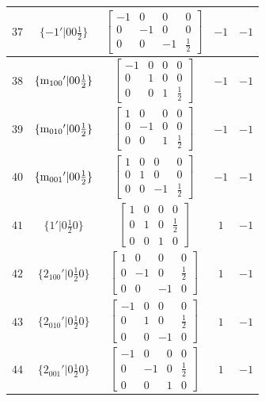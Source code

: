 \documentclass[fleqn,8pt]{jsarticle}
\begin{document}
\begin{longtable}{ccccc}
$ 37 $ & $ \{-1{}'|0 0 \frac{1}{2}\} $ & $ \begin{bmatrix} -1 & 0 & 0 & 0 \\ 0 & -1 & 0 & 0 \\ 0 & 0 & -1 & \frac{1}{2} \end{bmatrix} $ & $ -1 $ & $ -1 $ \\ \hline
$ 38 $ & $ \{{\rm m}_{100}{}'|0 0 \frac{1}{2}\} $ & $ \begin{bmatrix} -1 & 0 & 0 & 0 \\ 0 & 1 & 0 & 0 \\ 0 & 0 & 1 & \frac{1}{2} \end{bmatrix} $ & $ -1 $ & $ -1 $ \\ \hline
$ 39 $ & $ \{{\rm m}_{010}{}'|0 0 \frac{1}{2}\} $ & $ \begin{bmatrix} 1 & 0 & 0 & 0 \\ 0 & -1 & 0 & 0 \\ 0 & 0 & 1 & \frac{1}{2} \end{bmatrix} $ & $ -1 $ & $ -1 $ \\ \hline
$ 40 $ & $ \{{\rm m}_{001}{}'|0 0 \frac{1}{2}\} $ & $ \begin{bmatrix} 1 & 0 & 0 & 0 \\ 0 & 1 & 0 & 0 \\ 0 & 0 & -1 & \frac{1}{2} \end{bmatrix} $ & $ -1 $ & $ -1 $ \\ \hline
$ 41 $ & $ \{1{}'|0 \frac{1}{2} 0\} $ & $ \begin{bmatrix} 1 & 0 & 0 & 0 \\ 0 & 1 & 0 & \frac{1}{2} \\ 0 & 0 & 1 & 0 \end{bmatrix} $ & $ 1 $ & $ -1 $ \\ \hline
$ 42 $ & $ \{2{}_{100}{}'|0 \frac{1}{2} 0\} $ & $ \begin{bmatrix} 1 & 0 & 0 & 0 \\ 0 & -1 & 0 & \frac{1}{2} \\ 0 & 0 & -1 & 0 \end{bmatrix} $ & $ 1 $ & $ -1 $ \\ \hline
$ 43 $ & $ \{2{}_{010}{}'|0 \frac{1}{2} 0\} $ & $ \begin{bmatrix} -1 & 0 & 0 & 0 \\ 0 & 1 & 0 & \frac{1}{2} \\ 0 & 0 & -1 & 0 \end{bmatrix} $ & $ 1 $ & $ -1 $ \\ \hline
$ 44 $ & $ \{2{}_{001}{}'|0 \frac{1}{2} 0\} $ & $ \begin{bmatrix} -1 & 0 & 0 & 0 \\ 0 & -1 & 0 & \frac{1}{2} \\ 0 & 0 & 1 & 0 \end{bmatrix} $ & $ 1 $ & $ -1 $ \\ \hline

\end{longtable}
\end{document}
